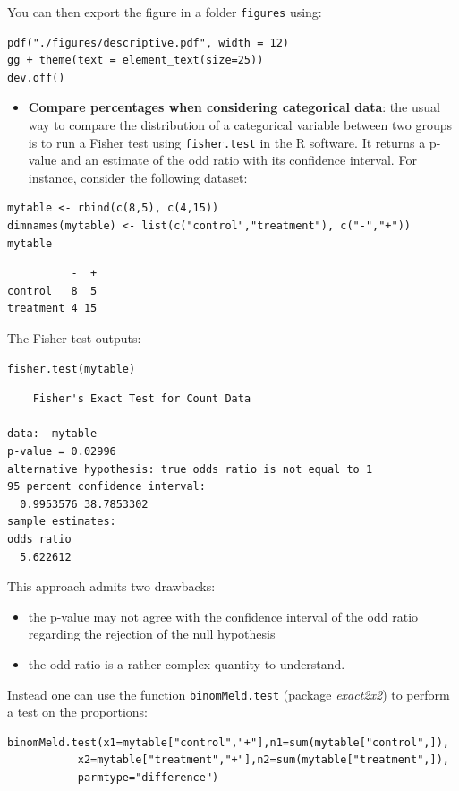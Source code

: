 \documentclass[12pt]{article}
\begin{document}
You can then export the figure in a folder \texttt{figures} using:
\lstset{language=r,label= ,caption= ,captionpos=b,numbers=none}
\begin{lstlisting}
pdf("./figures/descriptive.pdf", width = 12)
gg + theme(text = element_text(size=25))
dev.off()
\end{lstlisting}

\begin{itemize}
\item \textbf{Compare percentages when considering categorical data}: the usual
way to compare the distribution of a categorical variable between
two groups is to run a Fisher test using \texttt{fisher.test} in the R
software. It returns a p-value and an estimate of the odd ratio with
its confidence interval. For instance, consider the following
dataset:
\end{itemize}
\lstset{language=r,label= ,caption= ,captionpos=b,numbers=none}
\begin{lstlisting}
mytable <- rbind(c(8,5), c(4,15))
dimnames(mytable) <- list(c("control","treatment"), c("-","+"))
mytable
\end{lstlisting}

\begin{verbatim}
          -  +
control   8  5
treatment 4 15
\end{verbatim}
The Fisher test outputs:
\lstset{language=r,label= ,caption= ,captionpos=b,numbers=none}
\begin{lstlisting}
fisher.test(mytable)
\end{lstlisting}

\begin{verbatim}
	Fisher's Exact Test for Count Data

data:  mytable
p-value = 0.02996
alternative hypothesis: true odds ratio is not equal to 1
95 percent confidence interval:
  0.9953576 38.7853302
sample estimates:
odds ratio 
  5.622612
\end{verbatim}

This approach admits two drawbacks:
\begin{itemize}
\item the p-value may not agree with the confidence interval of the odd
ratio regarding the rejection of the null hypothesis
\item the odd ratio is a rather complex quantity to understand.
\end{itemize}
Instead one can use the function \texttt{binomMeld.test} (package \emph{exact2x2})
to perform a test on the proportions:
\lstset{language=r,label= ,caption= ,captionpos=b,numbers=none}
\begin{lstlisting}
binomMeld.test(x1=mytable["control","+"],n1=sum(mytable["control",]),
	       x2=mytable["treatment","+"],n2=sum(mytable["treatment",]),
	       parmtype="difference")
\end{lstlisting}
\end{document}
